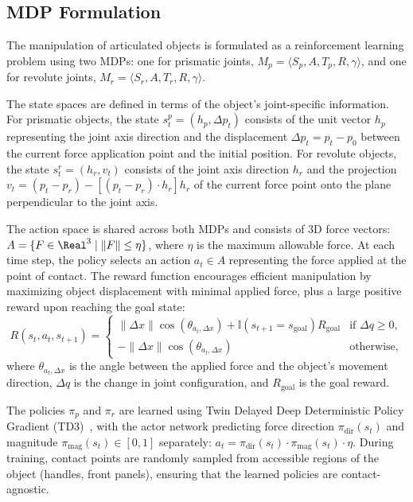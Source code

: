 \subsection{MDP Formulation}
\label{sec:flex_mdp}

The manipulation of articulated objects is formulated as a reinforcement learning problem using two MDPs: one for prismatic joints, $M_p = \langle S_p, A, T_p, R, \gamma \rangle$, and one for revolute joints, $M_r = \langle S_r, A, T_r, R, \gamma \rangle$.

The state spaces are defined in terms of the object's joint-specific information. For prismatic objects, the state $s^p_t = (h_p, \Delta p_t)$ consists of the unit vector $h_p$ representing the joint axis direction and the displacement $\Delta p_t = p_t - p_0$ between the current force application point and the initial position. For revolute objects, the state $s^r_t = (h_r, v_t)$ consists of the joint axis direction $h_r$ and the projection $v_t = (p_t - p_r) - [(p_t - p_r) \cdot h_r] h_r$ of the current force point onto the plane perpendicular to the joint axis.

The action space is shared across both MDPs and consists of 3D force vectors: $A = \{ F \in \Real^3 \mid \| F \| \leq \eta \}$, where $\eta$ is the maximum allowable force. At each time step, the policy selects an action $a_t \in A$ representing the force applied at the point of contact. The reward function encourages efficient manipulation by maximizing object displacement with minimal applied force, plus a large positive reward upon reaching the goal state:
\[
R(s_t, a_t, s_{t+1}) = \begin{cases}
\| \Delta x \| \cos(\theta_{a_t, \Delta x}) + \mathbb{I}(s_{t+1} = s_\text{goal}) R_\text{goal} & \text{if } \Delta q \geq 0, \\
-\| \Delta x \| \cos(\theta_{a_t, \Delta x}) & \text{otherwise},
\end{cases}
\]
where $\theta_{a_t, \Delta x}$ is the angle between the applied force and the object's movement direction, $\Delta q$ is the change in joint configuration, and $R_\text{goal}$ is the goal reward.

The policies $\pi_p$ and $\pi_r$ are learned using Twin Delayed Deep Deterministic Policy Gradient (TD3)~\citep{fujimoto2018td3}, with the actor network predicting force direction $\pi_\text{dir}(s_t)$ and magnitude $\pi_\text{mag}(s_t) \in [0, 1]$ separately: $a_t = \pi_\text{dir}(s_t) \cdot \pi_\text{mag}(s_t) \cdot \eta$. During training, contact points are randomly sampled from accessible regions of the object (handles, front panels), ensuring that the learned policies are contact-agnostic.

